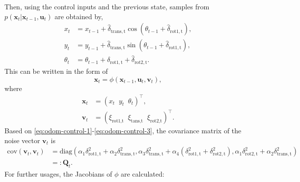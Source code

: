 Then, using the control inputs and the previous state, samples from $p(\mathbf{x}_t | \mathbf{x}_{t-1},\mathbf{u}_t)$
are obtained by,
\begin{align}
    x_t      & = x_{t-1} + \hat{\delta}_{\mathrm{trans,t}}\cos(\theta_{t-1} + \hat{\delta}_{\mathrm{rot1,t}}), \label{eq:prop-x} \\
    y_t      & = y_{t-1} + \hat{\delta}_{\mathrm{trans,t}}\sin(\theta_{t-1} + \hat{\delta}_{\mathrm{rot1,t}}), \label{eq:prop-y} \\
    \theta_t & = \theta_{t-1} + \hat{\delta}_{\mathrm{rot1,t}} + \hat{\delta}_{\mathrm{rot2,t}}. \label{eq:prop-theta}
\end{align}
This can be written in the form of
\begin{equation}
    \mathbf{x}_t = \phi(\mathbf{x}_{t-1},\mathbf{u}_t,\mathbf{v}_t),
\end{equation}
where
\begin{align}
    \mathbf{x}_t & = (x_t\;\;y_t\;\;\theta_t)^{\top},                                            \\
    \mathbf{v}_t & = (\xi_{\text{rot1,t}}\;\;\xi_{\text{tans,t}}\;\;\xi_{\text{rot2,t}})^{\top}.
\end{align}
Based on \eqref{eq:odom-control-1}-\eqref{eq:odom-control-3}, the covariance matrix of the noise
vector $\mathbf{v}_t$ is
\begin{align}\label{eq:control-covar}
    \text{cov}(\mathbf{v}_t,\mathbf{v}_t) & =
    \text{diag}(\alpha_1\delta_{\mathrm{rot1,t}}^2+\alpha_2\delta_{\mathrm{trans,t}}^2,
    \alpha_3\delta_{\mathrm{trans,t}}^2+\alpha_4(\delta_{\mathrm{rot1,t}}^2+\delta_{\mathrm{rot2,t}}^2),
    \alpha_1\delta_{\mathrm{rot2,t}}^2+\alpha_2\delta_{\mathrm{trans,t}}^2) \nonumber     \\
                                          & =:                              \mathbf{Q}_t.
\end{align}
For further usages, the Jacobians of $\phi$ are calculated:
